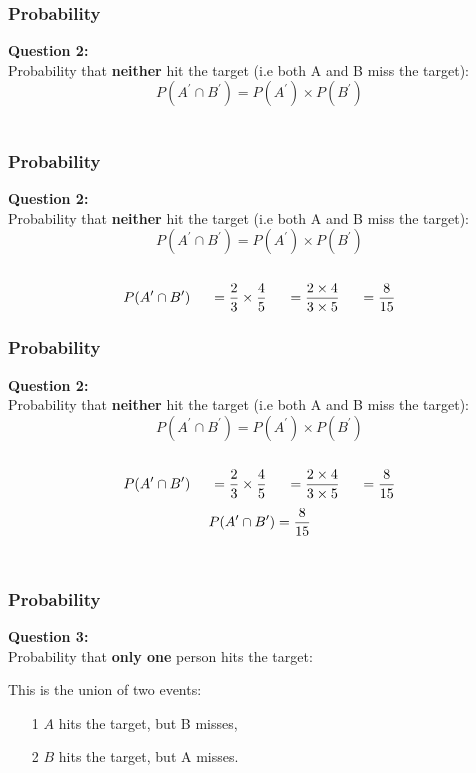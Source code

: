 \documentclass{beamer}
\begin{document}
\begin{frame}
\Large{
\frametitle{Probability}
\textbf{Question 2:}\\
Probability that \textbf{neither} hit the target (i.e both A and B miss the target): 
\[P(A^{\prime} \cap B^{\prime}) = P(A^{\prime}) \times P(B^{\prime})  \]\\
\vspace{2cm}
}
\end{frame}
\begin{frame}
\Large{
\frametitle{Probability}
\textbf{Question 2:}\\
Probability that \textbf{neither} hit the target (i.e both A and B miss the target): 
\[P(A^{\prime} \cap B^{\prime}) = P(A^{\prime}) \times P(B^{\prime})  \]\\
\[P(A^{\prime} \cap B^{\prime}) \hspace{0.5cm}= {2 \over 3} \times {4 \over 5} \hspace{0.5cm}  = {2 \times 4 \over 3 \times 5} \hspace{0.5cm} = {8 \over 15}  \]

}
\end{frame}
\begin{frame}
\Large{
\frametitle{Probability}
\textbf{Question 2:}\\
Probability that \textbf{neither} hit the target (i.e both A and B miss the target): 
\[P(A^{\prime} \cap B^{\prime}) = P(A^{\prime}) \times P(B^{\prime})  \]\\
\[P(A^{\prime} \cap B^{\prime}) \hspace{0.5cm}= {2 \over 3} \times {4 \over 5} \hspace{0.5cm}  = {2 \times 4 \over 3 \times 5} \hspace{0.5cm} = {8 \over 15}  \]
\[P(A^{\prime} \cap B^{\prime}) = {8 \over 15} \]\\
}
\end{frame}
\begin{frame}
\Large{
\frametitle{Probability}
\textbf{Question 3:}\\
Probability that \textbf{only one} person hits the target:

This is the union of two events:
\begin{itemize}
\item[1]  $A$ hits the target, but B misses,
\item[2]  $B$ hits the target, but A misses.
\end{itemize}

}
\end{frame}
\end{document}
